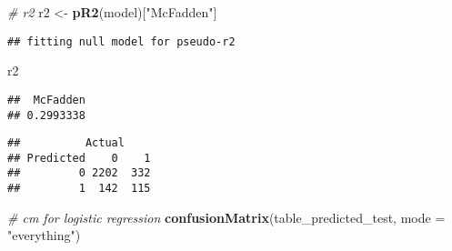 \documentclass[
]{article}
\newenvironment{Shaded}{\begin{snugshade}}{\end{snugshade}}
\newcommand{\AttributeTok}[1]{\textcolor[rgb]{0.13,0.29,0.53}{#1}}
\newcommand{\CommentTok}[1]{\textcolor[rgb]{0.56,0.35,0.01}{\textit{#1}}}
\newcommand{\DecValTok}[1]{\textcolor[rgb]{0.00,0.00,0.81}{#1}}
\newcommand{\FloatTok}[1]{\textcolor[rgb]{0.00,0.00,0.81}{#1}}
\newcommand{\FunctionTok}[1]{\textcolor[rgb]{0.13,0.29,0.53}{\textbf{#1}}}
\newcommand{\NormalTok}[1]{#1}
\newcommand{\OtherTok}[1]{\textcolor[rgb]{0.56,0.35,0.01}{#1}}
\newcommand{\SpecialCharTok}[1]{\textcolor[rgb]{0.81,0.36,0.00}{\textbf{#1}}}
\newcommand{\StringTok}[1]{\textcolor[rgb]{0.31,0.60,0.02}{#1}}
\begin{document}
\begin{Shaded}
\begin{Highlighting}[]
\CommentTok{\# r2}
\NormalTok{r2 }\OtherTok{\textless{}{-}} \FunctionTok{pR2}\NormalTok{(model)[}\StringTok{"McFadden"}\NormalTok{]}
\end{Highlighting}
\end{Shaded}

\begin{verbatim}
## fitting null model for pseudo-r2
\end{verbatim}

\begin{Shaded}
\begin{Highlighting}[]
\NormalTok{r2}
\end{Highlighting}
\end{Shaded}

\begin{verbatim}
##  McFadden 
## 0.2993338
\end{verbatim}

\begin{Shaded}
\end{Shaded}

\begin{verbatim}
##          Actual
## Predicted    0    1
##         0 2202  332
##         1  142  115
\end{verbatim}

\begin{Shaded}
\begin{Highlighting}[]
\CommentTok{\# cm for logistic regression}
\FunctionTok{confusionMatrix}\NormalTok{(table\_predicted\_test, }\AttributeTok{mode =} \StringTok{"everything"}\NormalTok{)}
\end{Highlighting}
\end{Shaded}
\end{document}
